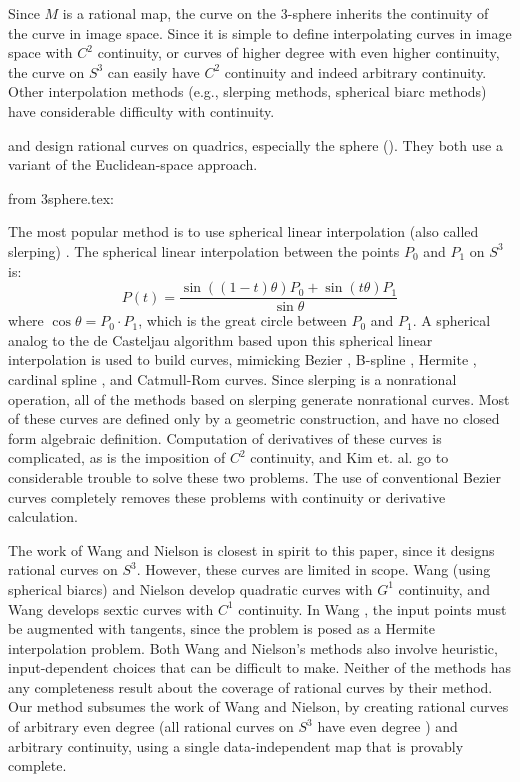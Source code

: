 Since $M$ is a rational map,
the curve on the 3-sphere inherits the continuity of the curve in image space.
Since it is simple to define interpolating curves
in image space with $C^2$ continuity, or curves of higher degree with
even higher continuity, 
the curve on $S^3$ can easily have $C^2$ continuity
and indeed arbitrary continuity.
Other interpolation methods (e.g., slerping methods, spherical biarc methods)
have considerable difficulty with continuity.

\cite{dietz93} and \cite{wang94} design rational curves on quadrics,
especially the sphere ().
They both use a variant of the Euclidean-space approach.

\cite{park95}

from 3sphere.tex:

The most popular method is to use spherical linear interpolation 
(also called slerping) 
\cite{shoemake85,duff85,pletinckx89,schlag91,nielson92,nielson93,kim95,nam95}.
The spherical linear interpolation between the points $P_0$ and $P_1$ on $S^3$ is:
\[ P(t) = \frac{\sin((1-t)\theta) P_0 + \sin(t \theta) P_1}{\sin \theta}
\]
where $\cos \theta = P_0 \cdot P_1$, which is the great circle between $P_0$ and $P_1$.
A spherical analog to the de Casteljau algorithm based upon this
spherical linear interpolation is used to build curves,
mimicking Bezier \cite{shoemake85,kim95}, B-spline 
\cite{duff85,nielson92,nielson93,kim95}, Hermite \cite{kim95,nam95},
cardinal spline \cite{pletinckx89}, and Catmull-Rom \cite{schlag91} curves.
Since slerping is a nonrational operation,
all of the methods based on slerping generate nonrational curves.
Most of these curves are defined only by a geometric construction, and have
no closed form algebraic definition.
Computation of derivatives of these curves is complicated,
as is the imposition of $C^2$ continuity, and
Kim et. al. \cite{kim95} go to considerable trouble to solve these two problems.
The use of conventional Bezier curves completely removes 
these problems with continuity or derivative calculation.

The work of Wang \cite{wang93, wang94} and Nielson \cite{nielson93}
is closest in spirit to this paper, since it designs rational curves on $S^3$.
However, these curves are limited in scope.
Wang \cite{wang93,wang94} (using spherical biarcs) 
and Nielson \cite{nielson93} develop quadratic curves
with $G^1$ continuity, and Wang \cite{wang94} develops sextic curves
with $C^1$ continuity.
In Wang \cite{wang93,wang94}, the input points must be augmented with 
tangents, since the problem is posed as a Hermite interpolation problem.
Both Wang and Nielson's methods also involve heuristic, input-dependent choices 
that can be difficult to make.
Neither of the methods has any completeness result about the
coverage of rational curves by their method.
Our method subsumes the work of Wang and Nielson, 
by creating rational curves of arbitrary
even degree (all rational curves on $S^3$ have even degree \cite{wang94}) 
and arbitrary continuity, using a single data-independent map that is provably complete.

